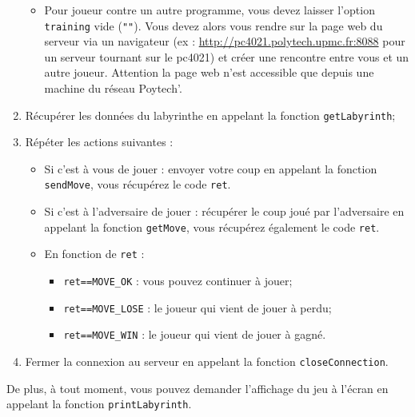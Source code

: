 \documentclass[french,12pt,a4paper,twoside,openright,titlepage]{report}
\begin{document}
\begin{enumerate}
\begin{itemize}
\item Pour joueur contre un autre programme, vous devez laisser l'option \texttt{training} vide (\verb|""|). Vous devez alors vous rendre sur la page web du serveur via un navigateur (ex : \url{http://pc4021.polytech.upmc.fr:8088} pour un serveur tournant sur le pc4021) et créer une rencontre entre vous et un autre joueur. Attention la page web n'est accessible que depuis une machine du réseau Poytech'.
\end{itemize}
\item Récupérer les données du labyrinthe en appelant la fonction \verb|getLabyrinth|;
\item Répéter les actions suivantes :
\begin{itemize}
\item Si c'est à vous de jouer : envoyer votre coup en appelant la fonction \verb|sendMove|, vous récupérez le code \verb|ret|.
\item Si c'est à l'adversaire de jouer : récupérer le coup joué par l'adversaire en appelant la fonction \verb|getMove|, vous récupérez également le code \verb|ret|.
\item En fonction de \verb|ret| :
\begin{itemize}
\item \verb|ret==MOVE_OK| : vous pouvez continuer à jouer;
\item \verb|ret==MOVE_LOSE| : le joueur qui vient de jouer à perdu;
\item \verb|ret==MOVE_WIN| : le joueur qui vient de jouer à gagné.
\end{itemize}
\end{itemize}
\item Fermer la connexion au serveur en appelant la fonction \verb|closeConnection|.
\end{enumerate}
De plus, à tout moment, vous pouvez demander l'affichage du jeu à l'écran en appelant la fonction \verb|printLabyrinth|.
\end{document}
